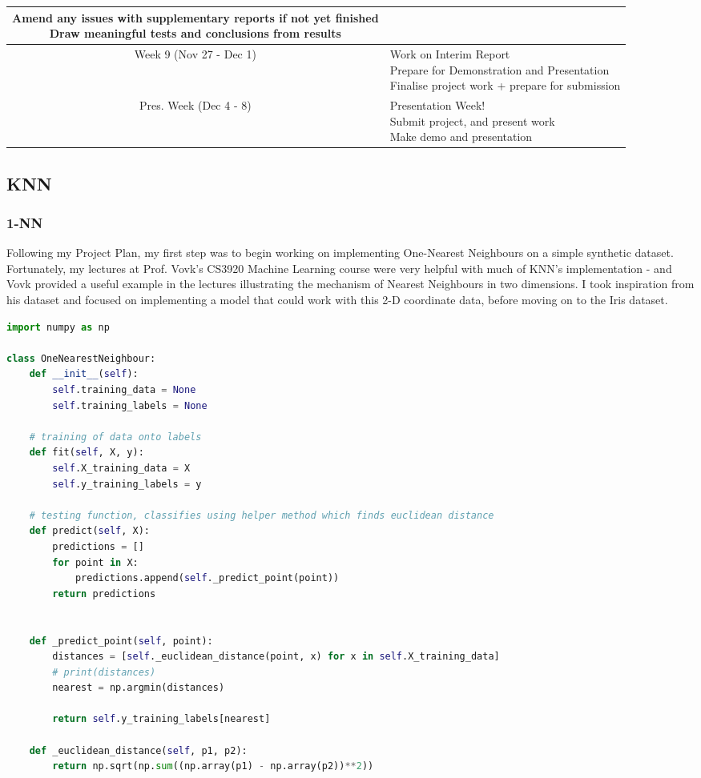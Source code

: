 \documentclass[letterpaper,10pt]{article}
\begin{document}
\begin{tabular}{|c|p{10cm}|}
{Amend any issues with supplementary reports if not yet finished \\
Draw meaningful tests and conclusions from results } \\
\hline
Week 9 (Nov 27 - Dec 1) & 
\makecell[l]{Work on Interim Report \\
Prepare for Demonstration and Presentation \\
Finalise project work + prepare for submission} \\
\hline
Pres. Week (Dec 4 - 8) & 
\makecell[l]{Presentation Week!\\
Submit project, and present work \\
Make demo and presentation} \\
\hline
\end{tabular}
\subsection{KNN}
\subsubsection{1-NN}
Following my Project Plan, my first step was to begin working on implementing One-Nearest Neighbours on a simple synthetic dataset. Fortunately, my lectures at Prof. Vovk's CS3920 Machine Learning course were very helpful with much of KNN's implementation - and Vovk provided a useful example in the lectures illustrating the mechanism of Nearest Neighbours in two dimensions. I took inspiration from his dataset and focused on implementing a model that could work with this 2-D coordinate data, before moving on to the Iris dataset.


\begin{lstlisting}[language=Python, caption=one\_nn.py]
    import numpy as np

class OneNearestNeighbour:
    def __init__(self):
        self.training_data = None
        self.training_labels = None

    # training of data onto labels
    def fit(self, X, y):
        self.X_training_data = X
        self.y_training_labels = y
    
    # testing function, classifies using helper method which finds euclidean distance
    def predict(self, X):
        predictions = []
        for point in X:
            predictions.append(self._predict_point(point))
        return predictions
    

    def _predict_point(self, point):
        distances = [self._euclidean_distance(point, x) for x in self.X_training_data]
        # print(distances)
        nearest = np.argmin(distances)

        return self.y_training_labels[nearest]

    def _euclidean_distance(self, p1, p2):
        return np.sqrt(np.sum((np.array(p1) - np.array(p2))**2))
\end{lstlisting}
\end{document}
